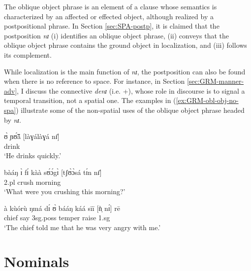 \begin{exe}
\begin{exe}
\begin{exe}
{The oblique object phrase is an element of a clause whose  semantics is
characterized by an  affected or effected object, although realized by a
postpositional phrase.  In Section \ref{sec:SPA-postp},  it is claimed that the
postposition {\it nɪ} (i) identifies an oblique object phrase, (ii) conveys that
the oblique object phrase contains the ground object in localization, and
(iii) follows its complement. 

While localization is
the main function of  {\it nɪ}, the postposition can also be found when there
is no  reference to space. For instance, in Section \ref{sec:GRM-manner-adv}, I
discuss the connective {\it denɪ} (i.e. {\dem}+{\postp}), whose role in
discourse is to signal a temporal transition, not a spatial one.  The
examples in (\ref{ex:GRM-obl-obj-no-spa}) illustrate some of the non-spatial
uses
of the oblique object phrase headed by {\it nɪ}.


\ea\label{ex:GRM-obl-obj-no-spa}

\ea
\gll ʊ̀ ɲʊ̃́ã́  [làɣálàɣá nɪ̄]  \\
      {\psg} drink {\dxm} {\postp}    \\
\glt  `He drinks quickly.' 

\ex
\gll bàáŋ ɪ̀ fɪ́ kàà sʊ́ɔ́gɪ̀ [tʃʊ̀ɔ̀sá tɪ́n nɪ̄]\\
 {\q} {\sc 2.pl} {\pst} {\egr} crush  morning {\art} {\postp}    \\
\glt  `What were you crushing this morning?' 

\ex\label{ex:GRM-obl-obj-no-spa-foc}
\gll à kùórù ŋmá dɪ́ ʊ̀ bááŋ káá sīī [ǹ̩ nɪ́] rē\\
{\art} chief say {\comp} {\sc 3sg.poss} temper {\egr} raise {\sc 1.sg} {\postp}
{\foc}\\
\glt  `The chief told me that he was very angry with me.' 


\z 
 \z

 



% 




\section{Nominals}
\label{sec:GRM-nom}


}
\end{exe}
\end{exe}
\end{exe}
